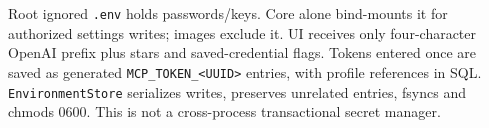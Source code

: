 Root ignored \texttt{.env} holds passwords/keys. Core alone bind-mounts it for authorized settings writes; images exclude it. UI receives only four-character OpenAI prefix plus stars and saved-credential flags. Tokens entered once are saved as generated \texttt{MCP\_TOKEN\_<UUID>} entries, with profile references in SQL. \texttt{EnvironmentStore} serializes writes, preserves unrelated entries, fsyncs and chmods 0600. This is not a cross-process transactional secret manager.
